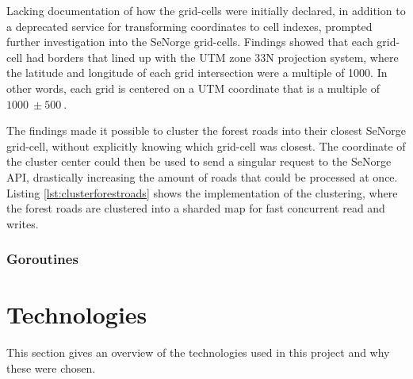 Lacking documentation of how the grid-cells were initially declared, in addition to a deprecated service for transforming coordinates to cell indexes, prompted further investigation into the SeNorge grid-cells. Findings showed that each grid-cell had borders that lined up with the UTM zone 33N projection system, where the latitude and longitude of each grid intersection were a multiple of \qty{1000}{}. In other words, each grid is centered on a UTM coordinate that is a multiple of $\qty{1000}{}\pm\qty{500}{}$.

The findings made it possible to cluster the forest roads into their closest SeNorge grid-cell, without explicitly knowing which grid-cell was closest. The coordinate of the cluster center could then be used to send a singular request to the SeNorge API, drastically increasing the amount of roads that could be processed at once. Listing \ref{lst:clusterforestroads} shows the implementation of the clustering, where the forest roads are clustered into a sharded map for fast concurrent read and writes.



\subsubsection{Goroutines}

\section{Technologies}
This section gives an overview of the technologies used in this project and why these were chosen.


